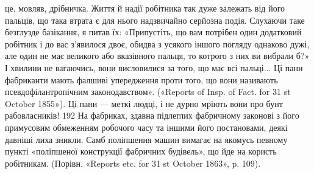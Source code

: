 це, мовляв, дрібничка. Життя й надії робітника так дуже залежать від
його пальців, що така втрата є для нього надзвичайно серйозна подія.
Слухаючи таке безглузде базікання, я питав їх: «Припустіть, що вам потрібен
один додатковий робітник і до вас з’явилося двоє, обидва з усякого
іншого погляду однаково дужі, але один не має великого або вказівного
пальця, то котрого з них ви вибрали б?» І хвилини не вагаючись, вони
висловилися за того, що має всі пальці... Ці пани фабриканти мають
фалшиві упередження проти того, що вони називають псевдофілантропічним
законодавством». («Reports of Insp. of Fact. for 31 st October
1855»). Ці пани — меткі людці, і не дурно мріють вони про бунт рабовласників!
192 На фабриках, здавна підлеглих фабричному законові з його примусовим
обмеженням робочого часу та іншими його постановами, деякі
давніші лиха зникли. Самб поліпшення машин вимагає на якомусь певному
пункті «поліпшеної конструкції фабричних будівель», що йде на
користь робітникам. (Порівн. «Reports etc. for 31 st October 1863», p. 109).